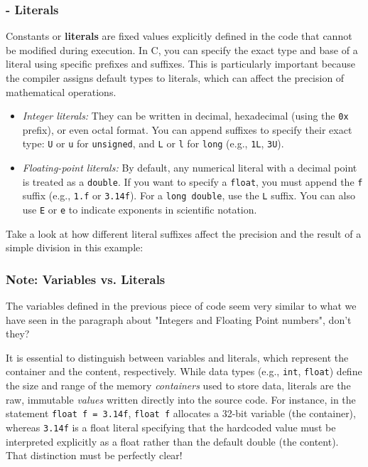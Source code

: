 \subsubsection{- Literals}

Constants or \textbf{literals} are fixed values explicitly defined in the code that cannot be modified during execution. In C, you can specify the exact type and base of a literal using specific prefixes and suffixes. This is particularly important because the compiler assigns default types to literals, which can affect the precision of mathematical operations.

\begin{itemize}
    \item[-] \textit{Integer literals:} They can be written in decimal, hexadecimal (using the \texttt{0x} prefix), or even octal format. You can append suffixes to specify their exact type: \texttt{U} or \texttt{u} for \texttt{unsigned}, and \texttt{L} or \texttt{l} for \texttt{long} (e.g., \texttt{1L}, \texttt{3U}).
    \item[-] \textit{Floating-point literals:} By default, any numerical literal with a decimal point is treated as a \texttt{double}. If you want to specify a \texttt{float}, you must append the \texttt{f} suffix (e.g., \texttt{1.f} or \texttt{3.14f}). For a \texttt{long double}, use the \texttt{L} suffix. You can also use \texttt{E} or \texttt{e} to indicate exponents in scientific notation.
\end{itemize}

Take a look at how different literal suffixes affect the precision and the result of a simple division in this example:



\hrulefill

\subsubsection{Note: Variables vs. Literals} 
The variables defined in the previous piece of code seem very similar to what we have seen in the paragraph about "Integers and Floating Point numbers", don't they? 

It is essential to distinguish between variables and literals, which represent the container and the content, respectively. While data types (e.g., \texttt{int}, \texttt{float}) define the size and range of the memory \textit{containers} used to store data, literals are the raw, immutable \textit{values} written directly into the source code. For instance, in the statement \texttt{float f = 3.14f}, \texttt{float f} allocates a 32-bit variable (the container), whereas \texttt{3.14f} is a float literal specifying that the hardcoded value must be interpreted explicitly as a float rather than the default double (the content).\\
That distinction must be perfectly clear!

